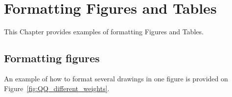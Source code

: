 \chapter{Formatting Figures and Tables}
\label{ch:conclusion}

This Chapter provides examples of formatting Figures and Tables. 

\section{Formatting figures}
An example of how to format several drawings in one figure is provided on Figure~\ref{fig:QQ_different_weights}.
\begin{figure}[!htb]
\centering
{}
\\
\quad
{}
\end{figure}
